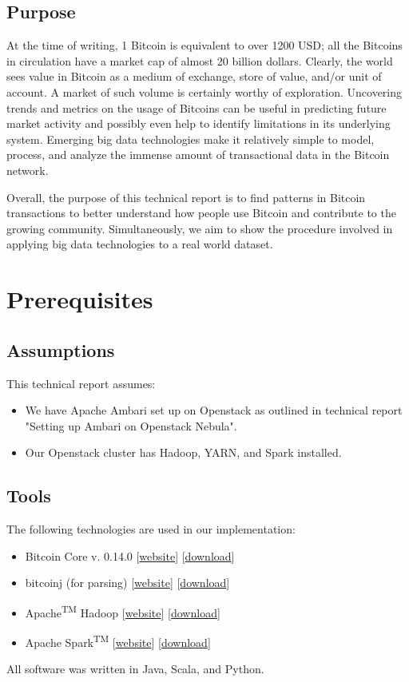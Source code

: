 \documentclass[9pt,twocolumn,twoside]{idsi}
\begin{document}
\subsection{Purpose}
At the time of writing, 1 Bitcoin is equivalent to over 1200 USD; all the Bitcoins in circulation have a market cap of almost 20 billion dollars. Clearly, the world sees value in Bitcoin as a medium of exchange, store of value, and/or unit of account. A market of such volume is certainly worthy of exploration. Uncovering trends and metrics on the usage of Bitcoins can be useful in predicting future market activity and possibly even help to identify limitations in its underlying system. Emerging big data technologies make it relatively simple to model, process, and analyze the immense amount of transactional data in the Bitcoin network.

Overall, the purpose of this technical report is to find patterns in Bitcoin transactions to better understand how people use Bitcoin and contribute to the growing community. Simultaneously, we aim to show the procedure involved in applying big data technologies to a real world dataset.

\section{Prerequisites}
\subsection{Assumptions}
This technical report assumes:
\begin{itemize}
    \item We have Apache Ambari set up on Openstack as outlined in technical report "Setting up Ambari on Openstack Nebula".
    \item Our Openstack cluster has Hadoop, YARN, and Spark installed.
\end{itemize}
\subsection{Tools}
The following technologies are used in our implementation:
\begin{itemize}
    \item Bitcoin Core v. 0.14.0 [\href{https://bitcoin.org/en/bitcoin-core/}{website}] [\href{https://bitcoin.org/en/download}{download}]
    \item bitcoinj (for parsing) [\href{https://bitcoinj.github.io/}{website}] [\href{https://bitcoinj.github.io/#getting-started}{download}]
    \item Apache\textsuperscript{TM} Hadoop\textsuperscript{\textregistered} [\href{http://hadoop.apache.org}{website}] [\href{http://hadoop.apache.org/#Download+Hadoop}{download}]
    \item Apache Spark\textsuperscript{TM} [\href{http://spark.apache.org/}{website}] [\href{http://spark.apache.org/downloads.html}{download}]
\end{itemize}
All software was written in Java, Scala, and Python.
\end{document}
